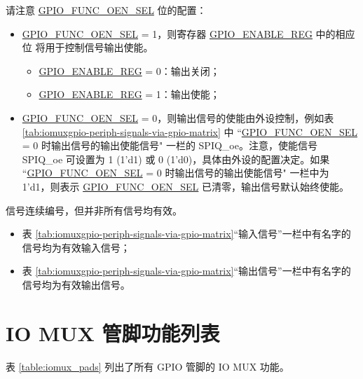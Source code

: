 \documentclass[main\_\_CN.tex]{subfiles}
\begin{document}
请注意 \hyperref[fielddesc:GPIOFUNCNOENSEL]{GPIO\_FUNC\_OEN\_SEL} 位的配置：

\begin{itemize}
    \item \hyperref[fielddesc:GPIOFUNCNOENSEL]{GPIO\_FUNC\_OEN\_SEL} = 1，则寄存器 \hyperref[regdesc:GPIOENABLEREG]{GPIO\_ENABLE\_REG} 中的相应位   将用于控制信号输出使能。
    \begin{itemize}
        \item \hyperref[regdesc:GPIOENABLEREG]{GPIO\_ENABLE\_REG} = 0：输出关闭；
        \item \hyperref[regdesc:GPIOENABLEREG]{GPIO\_ENABLE\_REG} = 1：输出使能；
    \end{itemize}
    \item \hyperref[fielddesc:GPIOFUNCNOENSEL]{GPIO\_FUNC\_OEN\_SEL} = 0，则输出信号的使能由外设控制，例如表 \ref{tab:iomuxgpio-periph-signals-via-gpio-matrix} 中 ``\hyperref[fielddesc:GPIOFUNCNOENSEL]{GPIO\_FUNC\_OEN\_SEL} = 0 时输出信号的输出使能信号" 一栏的 SPIQ\_oe。注意，使能信号 SPIQ\_oe 可设置为 1 (1'd1) 或 0 (1'd0)，具体由外设的配置决定。如果 ``\hyperref[fielddesc:GPIOFUNCNOENSEL]{GPIO\_FUNC\_OEN\_SEL} = 0 时输出信号的输出使能信号" 一栏中为 1'd1，则表示 \hyperref[fielddesc:GPIOFUNCNOENSEL]{GPIO\_FUNC\_OEN\_SEL} 已清零，输出信号默认始终使能。
\end{itemize}

\begin{tiplisting}
信号连续编号，但并非所有信号均有效。
\vspace{-1em}
\begin{itemize}
    \item 表 \ref{tab:iomuxgpio-periph-signals-via-gpio-matrix}“输入信号”一栏中有名字的信号均为有效输入信号；
    \item 表 \ref{tab:iomuxgpio-periph-signals-via-gpio-matrix}“输出信号”一栏中有名字的信号均为有效输出信号。
\end{itemize}
\end{tiplisting}

\begin{landscape}



\end{landscape}
\section{IO MUX 管脚功能列表}
\label{sec:iomux_pads}
表 \ref{table:iomux_pads} 列出了所有 GPIO 管脚的 IO MUX 功能。
\end{document}
